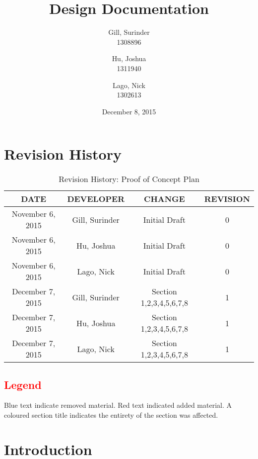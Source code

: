 \documentclass[11pt, oneside]{article}   	%
\title{Design Documentation
}
\author{Gill, Surinder\\
		1308896
		\and
		Hu, Joshua\\
		1311940
		\and
		Lago, Nick\\
		1302613}
\date{December 8, 2015}							%
\begin{document}
\maketitle
\newpage
\tableofcontents
\listoftables
\newpage

\section{Revision History}

\begin{table}[hp]
\caption{Revision History: Proof of Concept Plan}
\begin{center}
\label{tab:}
\begin{tabular}{|c|c|c|c|}
\hline
\textbf{DATE} & \textbf{DEVELOPER} & \textbf{CHANGE} & \textbf{REVISION}\\
\hline
November 6, 2015 & Gill, Surinder & Initial Draft & 0\\
\hline
November 6, 2015 & Hu, Joshua & Initial Draft & 0\\
\hline
November 6, 2015 & Lago, Nick & Initial Draft & 0\\
\hline
December 7, 2015 & Gill, Surinder & Section 1,2,3,4,5,6,7,8 & 1\\
\hline
December 7, 2015 & Hu, Joshua & Section 1,2,3,4,5,6,7,8  & 1\\
\hline
December 7, 2015 & Lago, Nick & Section 1,2,3,4,5,6,7,8  & 1\\
\hline
\end{tabular}
\end{center}
\label{default}
\end{table}

\subsection{\textcolor{red}{Legend}}
Blue text indicate removed material. Red text indicated added material. A coloured section title indicates the entirety of the section was affected.


\newpage
\section{Introduction}
\end{document}

